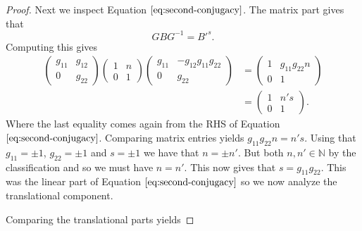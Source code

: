 \begin{proof}
    Next we inspect Equation $\ref{eq:second-conjugacy}$. The matrix part gives
    that $$ GBG^{-1} = B'^s .$$ Computing this gives
    \begin{align*}
        \begin{pmatrix}
            g_{11} & g_{12} \\
            0      & g_{22}
        \end{pmatrix}\begin{pmatrix}
                         1 & n \\
                         0 & 1
                     \end{pmatrix}\begin{pmatrix}
                                      g_{11} & -g_{12}g_{11}g_{22} \\
                                      0      & g_{22}
                                  \end{pmatrix} & = \begin{pmatrix}
                                                        1 & g_{11}g_{22}n \\
                                                        0 & 1
                                                    \end{pmatrix} \\
                                        & =\begin{pmatrix}
                                               1 & n's \\
                                               0 & 1
                                           \end{pmatrix}.
    \end{align*}
    Where the last equality comes again from the RHS of Equation $\ref{eq:second-conjugacy}$. Comparing matrix entries yields
    $g_{11}g_{22}n = n's$. Using that $g_{11} = \pm 1$,  $g_{22} = \pm 1$ and $s = \pm 1$ we have that $n = \pm n'$. But both $n,n' \in \mathbb{N}$ by the classification and so we must have $n = n'$.
    This now gives that $s = g_{11}g_{22}$. This was the linear part of Equation $\ref{eq:second-conjugacy}$ so we now analyze the translational component.

    Comparing the translational parts yields


\end{proof}
